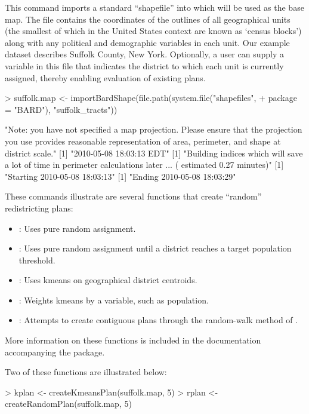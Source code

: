 \documentclass[article]{JSSstyle/jss}
\begin{document}
This command imports a standard ``shapefile'' into  which will be used as the base map.
The file contains the coordinates of the outlines of all geographical units (the smallest of which in the United States context are known as `census blocks') along with any political and demographic variables in each unit. Our example dataset describes Suffolk County, New York. Optionally, a user can supply a variable in this file that indicates the district to which each unit is currently assigned, thereby enabling evaluation of existing plans. 

\begin{Schunk}
\begin{Sinput}
> suffolk.map <- importBardShape(file.path(system.file("shapefiles", 
+     package = "BARD"), "suffolk_tracts"))
\end{Sinput}
\begin{Soutput}
[1] "Note: you have not specified a map projection. Please ensure that the projection you use provides reasonable representation of area, perimeter, and shape at district scale."
[1] "2010-05-08 18:03:13 EDT"
[1] "Building indices which will save a lot of time in perimeter calculations later ... ( estimated  0.27  minutes)"
[1] "Starting 2010-05-08 18:03:13"
[1] "Ending 2010-05-08 18:03:29"
\end{Soutput}
\end{Schunk}

These commands illustrate are several  functions that create ``random'' redistricting plans:
\begin{itemize}
	\item {}: Uses pure random assignment.
	\item {}: Uses pure random assignment until a district reaches a target population threshold.
	\item {}: Uses kmeans on geographical district centroids.
	\item {}: Weights kmeans by a variable, such as population.
	\item {}: Attempts to create contiguous plans through the random-walk method of \citet{CirDarOro00}.
\end{itemize}
More information on these functions is included in the documentation accompanying the package.

Two of these functions are illustrated below:
\begin{Schunk}
\begin{Sinput}
> kplan <- createKmeansPlan(suffolk.map, 5)
> rplan <- createRandomPlan(suffolk.map, 5)
\end{Sinput}
\end{Schunk}
\end{document}
